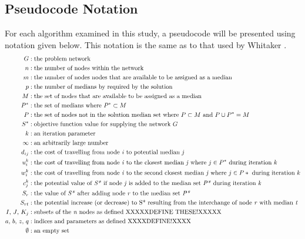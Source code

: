 \documentclass[11pt]{article}
\begin{document}
	\subsection{Pseudocode Notation}
	For each algorithm examined in this study, a pseudocode will be presented using notation given below.  This notation is the same as to that used by Whitaker \cite{WHIT83}.
	\begin{align*}
	G &: \text{the problem network}\\
	n &: \text{the number of nodes within the network}\\
	m &: \text{the number of nodes nodes that are available to be assigned as a median}\\
	p &: \text{the number of medians by required by the solution}\\
	M &: \text{the set of nodes that are available to be assigned as a median}\\
	P^{*} &: \text{the set of medians where } P^{*} \subset M\\
	P &: \text{the set of nodes not in the solution median set where } P \subset M \text{ and } P \cup P^{*} = M\\
	S^{*} &: \text{objective function value for supplying the network } G\\
	k &: \text{an iteration parameter}\\
	\infty &: \text{an arbitrarily large number}\\
	d_{ij} &: \text{the cost of travelling from node \emph{i} to potential median \emph{j}}\\
	u_{i}^{k} &: \text{the cost of travelling from node \emph{i} to the closest median \emph{j} where } j \in P^{*} \text{ during iteration } k\\
	w_{i}^{k} &: \text{the cost of travelling from node \emph{i} to the second closest median \emph{j} where } j \in P* \text{ during iteration } k\\
	c_{j}^{k} &: \text{the potential value of \emph{S*} if node \emph{j} is added to the median set \emph{P*} during iteration \emph{k}}\\
	S_{r} &: \text{the value of \emph{S*} after adding node \emph{r} to the median set \emph{P*}}\\
	S_{rt} &: \text{the potential increase (or decrease) to S* resulting from the interchange of node \emph{r} with median \emph{t}}\\
	I \text{, } J \text{, } K_{j} &: \text{subsets of the \emph{n} nodes as defined XXXXXDEFINE THESE!XXXXX}\\
	a \text{, } b \text{, } z \text{, } q &: \text{indices and parameters as defined XXXXDEFINE!XXXX}\\
	\emptyset &: \text{an empty set}	
	\end{align*}
	
\end{document}
